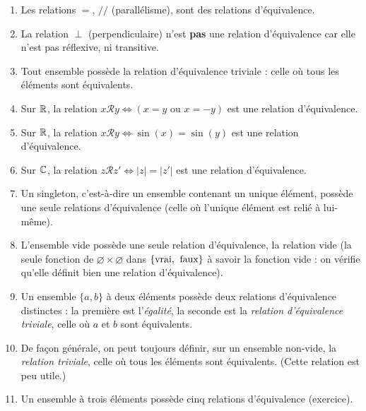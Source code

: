\begin{exemples}
\begin{enumerate}[label=\alph*)]
\item Les relations $=$, $//$ (parallélisme), sont des relations d'équivalence.
\item La relation $\perp$ (perpendiculaire) n'est \textbf{pas} une relation d'équivalence car elle n'est pas réflexive, ni transitive.
\item Tout ensemble possède la relation d'équivalence triviale : celle où tous les éléments sont équivalents.
\item Sur $\mathbb{R}$, la relation $x\mathcal R y \iff \left(x=y\text{ ou }x=-y\right)$ est une relation d'équivalence.
\item Sur $\mathbb{R}$, la relation $x\mathcal R y \iff \sin(x)=\sin(y)$ est une relation d'équivalence.
\item Sur $\mathbb{C}$, la relation $z\mathcal R z' \iff |z|=|z'|$ est une relation d'équivalence.

\item Un singleton, c'est-à-dire un ensemble contenant un unique élément, possède une seule relations d'équivalence (celle où l'unique élément est relié à lui-même).
\item L'ensemble vide possède une seule relation d'équivalence, la relation vide (la seule fonction de $\varnothing \times \varnothing$ dans $\{\text{vrai,\: faux}\}$ à savoir la fonction vide : on vérifie qu'elle définit bien une relation d'équivalence).
\item Un ensemble $\{a,b\}$ à deux éléments possède deux relations d'équivalence distinctes : la première est l'\emph{égalité}, la seconde est la \emph{relation d'équivalence triviale}, celle où $a$ et $b$ sont équivalents.
\item De façon générale, on peut toujours définir, sur un ensemble non-vide, la \emph{relation triviale}, celle où tous les éléments sont équivalents. (Cette relation est peu utile.)
\item Un ensemble à trois éléments possède cinq relations d'équivalence (exercice).
\end{enumerate}
\end{exemples}

